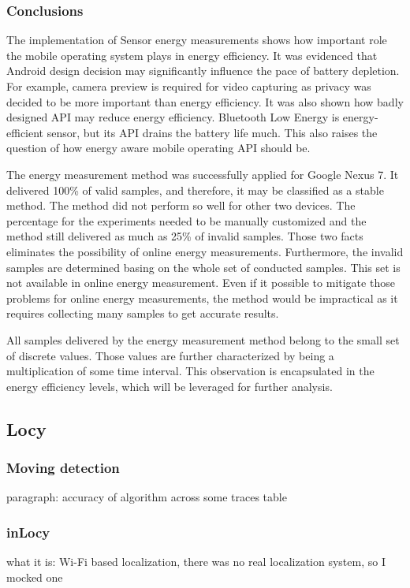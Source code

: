    
\subsubsection{Conclusions}   
\hspace{10pt} The implementation of Sensor energy measurements shows how important role the mobile operating system plays in energy efficiency. It was evidenced that Android design decision may significantly influence the pace of battery depletion. For example, camera preview is required for video capturing as privacy was decided to be more important than energy efficiency. It was also shown how badly designed API may reduce energy efficiency. Bluetooth Low Energy is energy-efficient sensor, but its API drains the battery life much. This also raises the question of how energy aware mobile operating API should be.

The energy measurement method was successfully applied for Google Nexus 7. It delivered 100\% of valid samples, and therefore, it may be classified as a stable method. The method did not perform so well for other two devices. The percentage for the experiments needed to be manually customized and the method still delivered as much as 25\% of invalid samples. Those two facts eliminates the possibility of online energy measurements. Furthermore, the invalid samples are determined basing on the whole set of conducted samples. This set is not available in online energy measurement. Even if it possible to mitigate those problems for online energy measurements, the method would be impractical as it requires collecting many samples to get accurate results.  

All samples delivered by the energy measurement method belong to the small set of discrete values. Those values are further characterized by being a multiplication of some time interval. This observation is encapsulated in the energy efficiency levels, which will be leveraged for further analysis. 

\subsection{Locy}

\subsubsection{Moving detection}
paragraph: accuracy of algorithm across some traces
	table
\subsubsection{inLocy}
what it is:
	Wi-Fi based localization, there was no real localization system, so I mocked one

